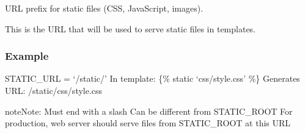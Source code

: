 \documentclass[letterpaper,10pt,english]{sphinxmanual}
\begin{document}
\begin{fulllineitems}
\label{\detokenize{softwareProject:softwareProject.settings.STATIC_URL}}
\pysigstartsignatures
\pysigline
{}
\pysigstopsignatures
\sphinxAtStartPar
URL prefix for static files (CSS, JavaScript, images).

\sphinxAtStartPar
This is the URL that will be used to serve static files in templates.
\subsubsection*{Example}

\sphinxAtStartPar
STATIC\_URL = ‘/static/’
In template: \{\% static ‘css/style.css’ \%\}
Generates URL: /static/css/style.css

\begin{sphinxadmonition}{note}{Note:}
\sphinxAtStartPar
Must end with a slash
Can be different from STATIC\_ROOT
For production, web server should serve files from STATIC\_ROOT at this URL
\end{sphinxadmonition}

\end{fulllineitems}

\end{document}

